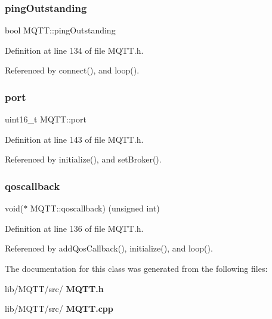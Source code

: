 \mbox{\label{class_m_q_t_t_ac02a4988506ab78812a1a9cc91be9007}} 
\subsubsection{ping\+Outstanding}
{\footnotesize\ttfamily bool M\+Q\+T\+T\+::ping\+Outstanding\hspace{0.3cm}{\ttfamily [private]}}



Definition at line 134 of file M\+Q\+T\+T.\+h.



Referenced by connect(), and loop().

\mbox{\label{class_m_q_t_t_a27559174e21256b6235ff281ba605fe8}} 
\subsubsection{port}
{\footnotesize\ttfamily uint16\+\_\+t M\+Q\+T\+T\+::port\hspace{0.3cm}{\ttfamily [private]}}



Definition at line 143 of file M\+Q\+T\+T.\+h.



Referenced by initialize(), and set\+Broker().

\mbox{\label{class_m_q_t_t_a3b5999625aa19e5198896195b5b5149c}} 
\subsubsection{qoscallback}
{\footnotesize\ttfamily void($\ast$ M\+Q\+T\+T\+::qoscallback) (unsigned int)\hspace{0.3cm}{\ttfamily [private]}}



Definition at line 136 of file M\+Q\+T\+T.\+h.



Referenced by add\+Qos\+Callback(), initialize(), and loop().



The documentation for this class was generated from the following files\+:\begin{DoxyCompactItemize}
\item 
lib/\+M\+Q\+T\+T/src/\textbf{ M\+Q\+T\+T.\+h}\item 
lib/\+M\+Q\+T\+T/src/\textbf{ M\+Q\+T\+T.\+cpp}\end{DoxyCompactItemize}
